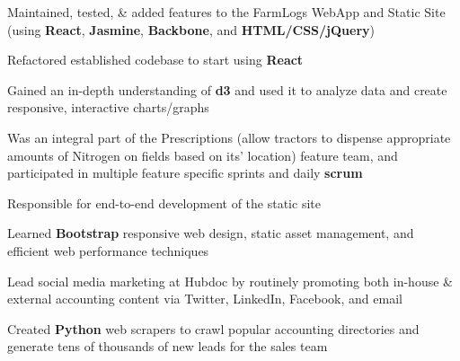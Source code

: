 \documentclass[letterpaper]{deedy-resume} %
\begin{document}
\begin{minipage}[t]{0.66\textwidth}

  \begin{tightitemize}
  \item Maintained, tested, \& added features to the FarmLogs WebApp and Static Site (using \textbf{React}, \textbf{Jasmine}, \textbf{Backbone}, and \textbf{HTML/CSS/jQuery})
  \item Refactored established codebase to start using \textbf{React}
  \item Gained an in-depth understanding of \textbf{d3} and used it to analyze data and create responsive, interactive charts/graphs
  \item Was an integral part of the Prescriptions (allow tractors to dispense appropriate amounts of Nitrogen on fields based on its' location) feature team, and participated in multiple feature specific sprints and daily \textbf{scrum}
  \end{tightitemize}

  \sectionspace %



  \begin{tightitemize}
  \item Responsible for end-to-end development of the static site
  \item Learned \textbf{Bootstrap} responsive web design, static asset management, and efficient web performance techniques
  \item Lead social media marketing at Hubdoc by routinely promoting both in-house \& external accounting content via Twitter, LinkedIn, Facebook, and email
  \item Created \textbf{Python} web scrapers to crawl popular accounting directories and generate tens of thousands of new leads for the sales team
  \end{tightitemize}

  \sectionspace %
  

\end{minipage}
\end{document}
